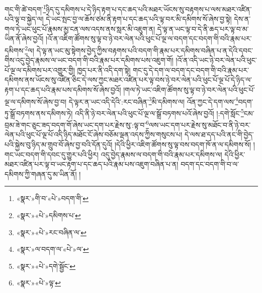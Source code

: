 གང་གི་ཚེ་བདག་\footnote{«སྣར་»གི་བ་«པེ་»བདག་གི་}ཉིད་དུ་དམིགས་པ་དེ་ཉིད་རྟག་པ་དང་ཆད་པའི་མཐར་ཡོངས་སུ་བརྟགས་པ་ལས་མཐར་འཛིན་པའི་ལྟ་བ་སྐྱེད་ལ། དེ་ཡང་སྤང་བྱ་ལ་ཆོས་ཙམ་ནི་རྟག་པ་དང་ཆད་པའི་ལྟ་བར་མི་དམིགས་སོ་ཞེས་བྱ་སྟེ། དེས་ན་གལ་ཏེ་ཡང་ཕུང་པོ་རྣམས་མྱ་ངན་ལས་འདས་ནས་སླར་མི་འཇུག་ན། དེ་ལྟ་ན་ཡང་ལྟ་བ་དེ་ནི་ཆད་པར་ལྟ་བ་མ་ཡིན་ནོ་ཞེས་བྱའོ། །འོ་ན་འཇིག་ཚོགས་སུ་ལྟ་བ་ཉེ་བར་ལེན་པའི་ཕུང་པོ་ལྔ་ལ་བདག་དང་བདག་གི་བའི་རྣམ་པར་དམིགས་\footnote{«སྣར་»«པེ་»དམིགས་པ་}ལ། དེ་ལྟ་ན་ཡང་མུ་སྟེགས་བྱེད་ཀྱིས་བརྟགས་པའི་བདག་གི་རྣམ་པར་དམིགས་བཞིན་པ་ན་དེའི་དབང་གིས་འདུ་བྱེད་རྣམས་ལ་ཡང་བདག་གི་བའི་རྣམ་པར་དམིགས་པས་འཇུག་གོ། །འོ་ན་འདི་ཡང་ཉེ་བར་ལེན་པའི་ཕུང་པོ་ལྔ་ལ་དམིགས་པར་འགྱུར་གྱི། ཁྱད་པར་ནི་འདི་དག་སྟེ། གང་དུ་དེ་དག་ལ་བདག་དང་བདག་གི་བའི་རྣམ་པར་དམིགས་ནས་ཡོངས་སུ་འཛིན་ཅིང་དེ་ལས་ཀྱང་མཐར་འཛིན་པར་ལྟ་བས་ཉེ་བར་ལེན་པའི་ཕུང་པོ་ལྔ་པོ་དེ་ཉིད་ལ་རྟག་པ་དང་ཆད་པའི་རྣམ་པས་དམིགས་སོ་ཞེས་བྱའོ། །གལ་ཏེ་ཡང་འཇིག་ཚོགས་སུ་ལྟ་བ་ཉེ་བར་ལེན་པའི་ཕུང་པོ་ལྔ་ལ་དམིགས་སོ་ཞེས་བྱ་བ། དེ་ལྟར་ན་ཡང་འདི་དེའི་:རང་བཞིན་\footnote{«སྣར་»«པེ་»རང་བཞིན་ལ་}མི་དམིགས་ལ། འོན་ཀྱང་དེ་དག་ལས་\footnote{«སྣར་»ལ་བདག་ལ་«པེ་»ལ་}བདག་ཏུ་སྒྲོ་བཏགས་ནས་དམིགས་ཏེ། འདི་ནི་ཉེ་བར་ལེན་པའི་ཕུང་པོ་ལྔ་ལ་སྒྲོ་བཏགས་པའོ་ཞེས་བྱའོ། །:དགེ་སློང་\footnote{«སྣར་»«པེ་»དགེ་སྦྱོང་}ངམ་བྲམ་ཟེ་གང་ཅུང་ཟད་བདག་གོ་ཞེས་ཡང་དག་པར་རྗེས་སུ་:ལྟ་བ་\footnote{«སྣར་»«པེ་»ལྟ་}ལས་ཡང་དག་པར་རྗེས་སུ་མཐོང་བ་ནི་ཉེ་བར་ལེན་པའི་ཕུང་པོ་ལྔ་པོ་འདི་ཉིད་མཐོང་ངོ་ཞེས་བཅོམ་ལྡན་འདས་ཀྱིས་གསུངས་པ། དེ་ལས་ཐ་དད་པའི་ནང་གི་བྱེད་པའི་སྐྱེས་བུ་ཉིད་མ་གྲུབ་བོ་ཞེས་བྱ་བའི་དོན་དུའོ། །དེའི་ཕྱིར་འཇིག་ཚོགས་སུ་ལྟ་བས་བདག་ཁོ་ན་ལ་དམིགས་སོ། །གང་ཡང་བདག་གི་དབང་དུ་གྱུར་པའི་ཕྱིར། འདུ་བྱེད་རྣམས་ལ་བདག་གི་བའི་རྣམ་པར་དམིགས་ལ། དེའི་ཕྱིར་མཐར་འཛིན་པར་ལྟ་བ་ཡང་རྟག་པ་དང་ཆད་པའི་རྣམ་པས་འཇུག་བཞིན་པ་ན། བདག་དང་བདག་གི་བ་ལ་དམིགས་ཀྱི་གཞན་དུ་མ་ཡིན་ནོ། །
